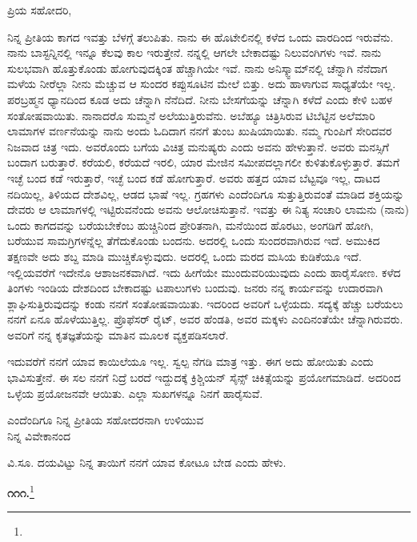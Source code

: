\noindent
ಪ್ರಿಯ ಸಹೋದರಿ,

ನಿನ್ನ ಪ್ರೀತಿಯ ಕಾಗದ ಇವತ್ತು ಬೆಳಗ್ಗೆ ತಲುಪಿತು. ನಾನು ಈ ಹೊಟೇಲಿನಲ್ಲಿ ಕಳೆದ ಒಂದು ವಾರದಿಂದ ಇರುವೆನು. ನಾನು ಬಾಸ್ಟನ್ನಿನಲ್ಲಿ ಇನ್ನೂ ಕೆಲವು ಕಾಲ ಇರುತ್ತೇನೆ. ನನ್ನಲ್ಲಿ ಆಗಲೇ ಬೇಕಾದಷ್ಟು ನಿಲುವಂಗಿಗಳು ಇವೆ. ನಾನು ಸುಲಭವಾಗಿ ಹೊತ್ತುಕೊಂಡು ಹೋಗುವುದಕ್ಕಿಂತ ಹೆಚ್ಚಾಗಿಯೇ ಇವೆ. ನಾನು ಅನಿಸ್ಕ್ವಾಮ್‌ನಲ್ಲಿ ಚೆನ್ನಾಗಿ ನೆನೆದಾಗ ಮಳೆಯ ನೀರೆಲ್ಲಾ ನೀನು ಮೆಚ್ಚುವ ಆ ಸುಂದರ ಕಪ್ಪುಸೂಟಿನ ಮೇಲೆ ಬಿತ್ತು. ಅದು ಹಾಳಾಗುವ ಸಾಧ್ಯತೆಯೇ ಇಲ್ಲ. ಪರಬ್ರಹ್ಮನ ಧ್ಯಾನದಿಂದ ಕೂಡ ಅದು ಚೆನ್ನಾಗಿ ನೆನೆದಿದೆ. ನೀನು ಬೇಸಗೆಯನ್ನು ಚೆನ್ನಾಗಿ ಕಳೆದೆ ಎಂದು ಕೇಳಿ ಬಹಳ ಸಂತೋಷವಾಯಿತು. ನಾನಾದರೊ ಸುಮ್ಮನೆ ಅಲೆಯುತ್ತಿರುವೆನು. ಅಬೆಹ್ಯೂ ಚಿತ್ರಿಸಿರುವ ಟಿಬೆಟ್ಟಿನ ಅಲೆಮಾರಿ ಲಾಮಾಗಳ ವರ್ಣನೆಯನ್ನು ನಾನು ಅಂದು ಓದಿದಾಗ ನನಗೆ ತುಂಬ ಖುಷಿಯಾಯಿತು. ನಮ್ಮ ಗುಂಪಿಗೆ ಸೇರಿದವರ ನಿಜವಾದ ಚಿತ್ರ ಇದು. ಅವರೊಂದು ಬಗೆಯ ವಿಚಿತ್ರ ಮನುಷ್ಯರು ಎಂದು ಅವನು ಹೇಳುತ್ತಾನೆ. ಅವರು ಮನಸ್ಸಿಗೆ ಬಂದಾಗ ಬರುತ್ತಾರೆ. ಕರೆಯಲಿ, ಕರೆಯದೆ ಇರಲಿ, ಯಾರ ಮೇಜಿನ ಸಮೀಪದಲ್ಲಾಗಲೀ ಕುಳಿತುಕೊಳ್ಳುತ್ತಾರೆ. ತಮಗೆ ಇಚ್ಛೆ ಬಂದ ಕಡೆ ಇರುತ್ತಾರೆ, ಇಚ್ಛೆ ಬಂದ ಕಡೆ ಹೋಗುತ್ತಾರೆ. ಅವರು ಹತ್ತದ ಯಾವ ಬೆಟ್ಟವೂ ಇಲ್ಲ, ದಾಟದ ನದಿಯಿಲ್ಲ, ತಿಳಿಯದ ದೇಶವಿಲ್ಲ, ಆಡದ ಭಾಷೆ ಇಲ್ಲ. ಗ್ರಹಗಳು ಎಂದೆಂದಿಗೂ ಸುತ್ತುತ್ತಿರುವಂತೆ ಮಾಡಿದ ಶಕ್ತಿಯನ್ನು ದೇವರು ಆ ಲಾಮಾಗಳಲ್ಲಿ ಇಟ್ಟಿರುವನೆಂದು ಅವನು ಆಲೋಚಿಸುತ್ತಾನೆ. ಇವತ್ತು ಈ ನಿತ್ಯ ಸಂಚಾರಿ ಲಾಮನು (ನಾನು) ಒಂದು ಕಾಗದವನ್ನು ಬರೆಯಬೇಕೆಂಬ ಹುಚ್ಚಿನಿಂದ ಪ್ರೇರಿತನಾಗಿ, ಮನೆಯಿಂದ ಹೊರಟು, ಅಂಗಡಿಗೆ ಹೋಗಿ, ಬರೆಯುವ ಸಾಮಗ್ರಿಗಳನ್ನೆಲ್ಲ ತೆಗೆದುಕೊಂಡು ಬಂದನು. ಅದರಲ್ಲಿ ಒಂದು ಸುಂದರವಾಗಿರುವ  ಇದೆ. ಅಮುಕಿದ ತಕ್ಷಣವೇ ಅದು ಶಬ್ದ ಮಾಡಿ ಮುಚ್ಚಿಕೊಳ್ಳುವುದು. ಅದರಲ್ಲಿ ಒಂದು ಮರದ ಮಸಿಯ ಕುಡಿಕೆಯೂ ಇದೆ. ಇಲ್ಲಿಯವರೆಗೆ ಇದೇನೊ ಆಶಾಜನಕವಾಗಿದೆ. ಇದು ಹೀಗೆಯೇ ಮುಂದುವರಿಯುವುದು ಎಂದು ಹಾರೈಸೋಣ. ಕಳೆದ ತಿಂಗಳು ಇಂಡಿಯ ದೇಶದಿಂದ ಬೇಕಾದಷ್ಟು ಟಪಾಲುಗಳು ಬಂದುವು. ಜನರು ನನ್ನ ಕಾರ್ಯವನ್ನು ಉದಾರವಾಗಿ ಶ್ಲಾಘಿಸುತ್ತಿರುವುದನ್ನು ಕಂಡು ನನಗೆ ಸಂತೋಷವಾಯಿತು. ಇದರಿಂದ ಅವರಿಗೆ ಒಳ್ಳೆಯದು. ಸದ್ಯಕ್ಕೆ ಹೆಚ್ಚು ಬರೆಯಲು ನನಗೆ ಏನೂ ಹೊಳೆಯುತ್ತಿಲ್ಲ. ಪ್ರೊಫೆಸರ್ ರೈಟ್, ಅವರ ಹೆಂಡತಿ, ಅವರ ಮಕ್ಕಳು ಎಂದಿನಂತೆಯೇ ಚೆನ್ನಾಗಿರುವರು. ಅವರಿಗೆ ನನ್ನ ಕೃತಜ್ಞತೆಯನ್ನು ಮಾತಿನ ಮೂಲಕ ವ್ಯಕ್ತಪಡಿಸಲಾರೆ.

ಇದುವರೆಗೆ ನನಗೆ ಯಾವ ಕಾಯಿಲೆಯೂ ಇಲ್ಲ. ಸ್ವಲ್ಪ ನೆಗಡಿ ಮಾತ್ರ ಇತ್ತು. ಈಗ ಅದು ಹೋಯಿತು ಎಂದು ಭಾವಿಸುತ್ತೇನೆ. ಈ ಸಲ ನನಗೆ ನಿದ್ರೆ ಬರದೆ ಇದ್ದುದಕ್ಕೆ ಕ್ರಿಶ್ಚಿಯನ್ ಸೈನ್ಸ್ ಚಿಕಿತ್ಸೆಯನ್ನು ಪ್ರಯೋಗಮಾಡಿದೆ. ಅದರಿಂದ ಒಳ್ಳೆಯ ಪ್ರಯೋಜನವೇ ಆಯಿತು. ಎಲ್ಲಾ ಸುಖಗಳನ್ನೂ ನಿನಗೆ ಹಾರೈಸುವೆ.

\begin{flushright}
ಎಂದೆಂದಿಗೂ ನಿನ್ನ ಪ್ರೀತಿಯ ಸಹೋದರನಾಗಿ ಉಳಿಯುವ\\ನಿನ್ನ ವಿವೇಕಾನಂದ
\end{flushright}

ವಿ.ಸೂ. ದಯವಿಟ್ಟು ನಿನ್ನ ತಾಯಿಗೆ ನನಗೆ ಯಾವ ಕೋಟೂ ಬೇಡ ಎಂದು ಹೇಳು.

\begin{center}
\textbf{೧೧೧.}\footnote{}
\end{center}

